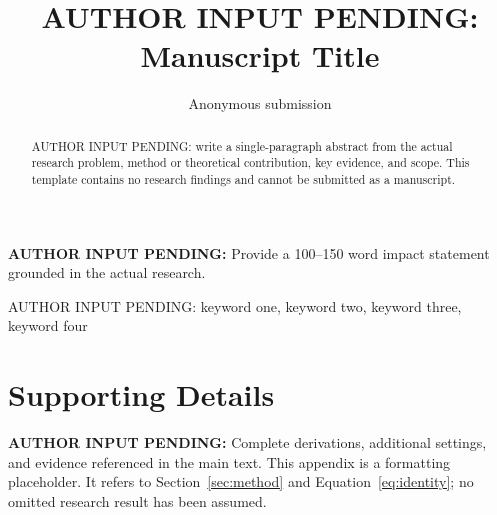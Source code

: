 \documentclass[journal]{IEEEtai}
\title{AUTHOR INPUT PENDING: Manuscript Title}\author{Anonymous submission}
\newcommand{\AuthorPending}[1]{\textbf{AUTHOR INPUT PENDING:} #1}
\begin{document}
\maketitle
\begin{abstract}
AUTHOR INPUT PENDING: write a single-paragraph abstract from the actual research problem,
method or theoretical contribution, key evidence, and scope. This template contains
no research findings and cannot be submitted as a manuscript.
\end{abstract}
\begin{IEEEImpStatement}\AuthorPending{Provide a 100--150 word impact statement grounded in the actual research.}\end{IEEEImpStatement}
\begin{IEEEkeywords}AUTHOR INPUT PENDING: keyword one, keyword two, keyword three, keyword four\end{IEEEkeywords}


\appendix
\section{Supporting Details}
\label{app:supporting}
\AuthorPending{Complete derivations, additional settings, and evidence referenced in the main text.}
This appendix is a formatting placeholder. It refers to Section~\ref{sec:method} and
Equation~\ref{eq:identity}; no omitted research result has been assumed.
\end{document}
